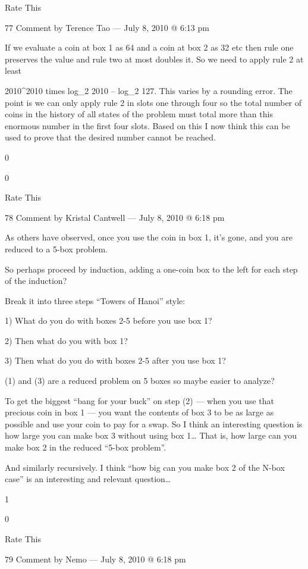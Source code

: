     Rate This

    77 Comment by Terence Tao — July 8, 2010 @ 6:13 pm

    If we evaluate a coin at box 1 as 64 and a coin at box 2 as 32 etc then rule one preserves the value and rule two at most doubles it. So we need to apply rule 2 at least {2010^{2010} times log_2 2010 – log_2 127. This varies by a rounding error. The point is we can only apply rule 2 in slots one through four
    so the total number of coins in the history of all states of the problem must total more than this enormous number in the first four slots. Based on this I now think this can be used to prove that the desired number cannot be reached.
     
    0
     
    0
     
    Rate This

    78 Comment by Kristal Cantwell — July 8, 2010 @ 6:18 pm

    As others have observed, once you use the coin in box 1, it’s gone, and you are reduced to a 5-box problem.

    So perhaps proceed by induction, adding a one-coin box to the left for each step of the induction?

    Break it into three steps “Towers of Hanoi” style:

    1) What do you do with boxes 2-5 before you use box 1?

    2) Then what do you with box 1?

    3) Then what do you do with boxes 2-5 after you use box 1?

    (1) and (3) are a reduced problem on 5 boxes so maybe easier to analyze?

    To get the biggest “bang for your buck” on step (2) — when you use that precious coin in box 1 — you want the contents of box 3 to be as large as possible and use your coin to pay for a swap. So I think an interesting question is how large you can make box 3 without using box 1… That is, how large can you make box 2 in the reduced “5-box problem”.

    And similarly recursively. I think “how big can you make box 2 of the N-box case” is an interesting and relevant question…
     
    1
     
    0
     
    Rate This

    79 Comment by Nemo — July 8, 2010 @ 6:18 pm

}
